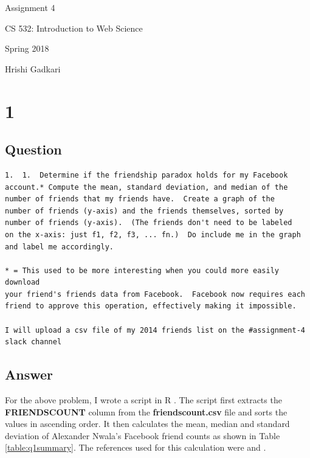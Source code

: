 \documentclass[letterpaper,11pt]{article}
\begin{document}
\begin{titlepage}

\begin{center}

\Huge{Assignment 4}

\Large{CS 532:  Introduction to Web Science}

\Large{Spring 2018}

\Large{Hrishi Gadkari}


\end{center}

\end{titlepage}

\newpage


\section*{1}


\subsection*{Question}

\begin{verbatim}
1.  1.  Determine if the friendship paradox holds for my Facebook
account.* Compute the mean, standard deviation, and median of the
number of friends that my friends have.  Create a graph of the
number of friends (y-axis) and the friends themselves, sorted by
number of friends (y-axis).  (The friends don't need to be labeled
on the x-axis: just f1, f2, f3, ... fn.)  Do include me in the graph
and label me accordingly.

* = This used to be more interesting when you could more easily download
your friend's friends data from Facebook.  Facebook now requires each
friend to approve this operation, effectively making it impossible.

I will upload a csv file of my 2014 friends list on the #assignment-4 slack channel
\end{verbatim}

\clearpage
\subsection*{Answer}

For the above problem, I wrote a script in R \cite{rdocref}. The script first extracts the  \textbf{FRIENDSCOUNT} column from the \textbf{friendscount.csv} file and sorts the values in ascending order. It then calculates the mean, median and standard deviation of Alexander Nwala’s Facebook friend counts as shown in Table \ref{table:q1summary}. The references used for this calculation were \cite{sortref} and \cite{statref}. 
\end{document}
